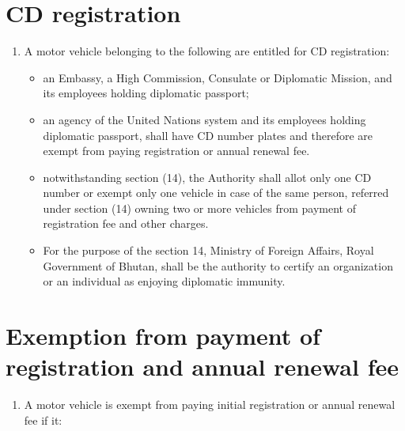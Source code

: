 \documentclass[
]{book}
\providecommand{\tightlist}{%
  \setlength{\itemsep}{0pt}\setlength{\parskip}{0pt}}
\begin{document}
\hypertarget{cd-registration}{%
\section{CD registration}\label{cd-registration}}

\begin{enumerate}
\def\labelenumi{\alph{enumi}.}
\tightlist
\item
  A motor vehicle belonging to the following are entitled for CD registration:

  \begin{itemize}
  \tightlist
  \item
    an Embassy, a High Commission, Consulate or Diplomatic Mission, and its employees holding diplomatic passport;
  \item
    an agency of the United Nations system and its employees holding diplomatic passport, shall have CD number plates and therefore are exempt from paying registration or annual renewal fee.
  \item
    notwithstanding section (14), the Authority shall allot only one CD number or exempt only one vehicle in case of the same person, referred under section (14) owning two or more vehicles from payment of registration fee and other charges.
  \item
    For the purpose of the section 14, Ministry of Foreign Affairs, Royal Government of Bhutan, shall be the authority to certify an organization or an individual as enjoying diplomatic immunity.
  \end{itemize}
\end{enumerate}

\hypertarget{exemption-from-payment-of-registration-and-annual-renewal-fee}{%
\section{Exemption from payment of registration and annual renewal fee}\label{exemption-from-payment-of-registration-and-annual-renewal-fee}}

\begin{enumerate}
\def\labelenumi{\alph{enumi}.}
\tightlist
\item
  A motor vehicle is exempt from paying initial registration or annual renewal fee if it:
\end{enumerate}
\end{document}
